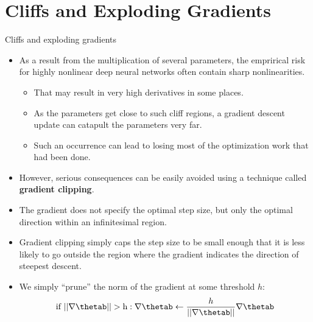 \section{Cliffs and Exploding Gradients}
\begin{vbframe}{Cliffs and exploding gradients}
  \begin{itemize}
    \item As a result from the multiplication of several parameters, the emprirical risk for highly nonlinear deep neural networks often contain sharp nonlinearities.
      \begin{itemize}
        \item That may result in very high derivatives in some places.
        \item As the parameters get close to such cliff regions, a gradient descent update can catapult the parameters very far.
        \item Such an occurrence can lead to losing most of the optimization work that had been done.
      \end{itemize}
    \item However, serious consequences can be easily avoided using a technique called \textbf{gradient
clipping}.
    \item The gradient does not specify the optimal step size, but only the optimal direction
within an infinitesimal region.
\framebreak 
    \item Gradient clipping simply caps the step size to be small enough that it is less likely to go outside the region where the gradient indicates the direction of steepest descent.
    \item We simply \enquote{prune} the norm of the gradient at some threshold $h$:
    $$\text{if  } ||\nabla \thetab|| > \text h: \nabla \thetab \leftarrow \frac{h}{||\nabla \thetab||} \nabla \thetab $$
  \end{itemize}
\end{vbframe}


